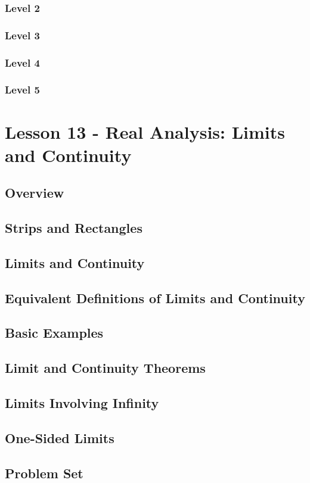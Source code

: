 \documentclass{article}
\begin{document}
\begin{theorem}
\subsubsection{Level 2}
\subsubsection{Level 3}
\subsubsection{Level 4}
\subsubsection{Level 5}
\pagebreak

\section{Lesson 13 - Real Analysis: Limits and Continuity}
\subsection{Overview}
\subsection{Strips and Rectangles}
\subsection{Limits and Continuity}
\subsection{Equivalent Definitions of Limits and Continuity}
\subsection{Basic Examples}
\subsection{Limit and Continuity Theorems}
\subsection{Limits Involving Infinity}
\subsection{One-Sided Limits}
\subsection{Problem Set}

\end{theorem}
\end{document}
